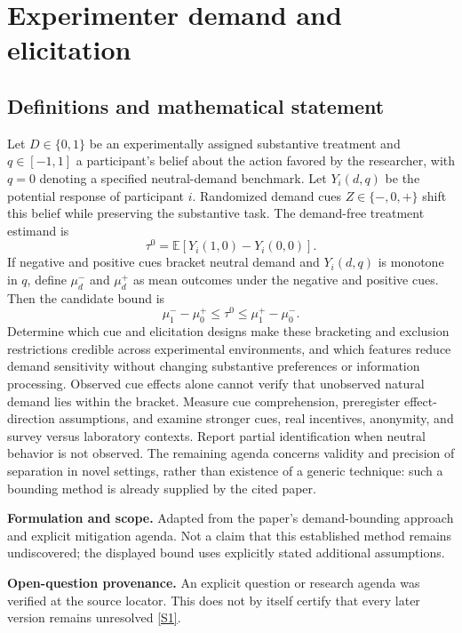\documentclass[11pt]{article}
\newcommand{\sref}[2]{\hyperlink{source:#1:#2}{[S#2]}}
\begin{document}
\section*{Experimenter demand and elicitation}\label{30007589}
\subsection{Definitions and mathematical statement}
Let \(D\in\{0,1\}\) be an experimentally assigned substantive treatment and \(q\in[-1,1]\) a participant's belief about the action favored by the researcher, with \(q=0\) denoting a specified neutral-demand benchmark. Let \(Y_i(d,q)\) be the potential response of participant \(i\). Randomized demand cues \(Z\in\{-,0,+\}\) shift this belief while preserving the substantive task. The demand-free treatment estimand is
\[\tau^0=\mathbb E[Y_i(1,0)-Y_i(0,0)].\]
If negative and positive cues bracket neutral demand and \(Y_i(d,q)\) is monotone in \(q\), define \(\mu_d^-\) and \(\mu_d^+\) as mean outcomes under the negative and positive cues. Then the candidate bound is
\[\mu_1^- -\mu_0^+\leq\tau^0\leq\mu_1^+ -\mu_0^-.\]
Determine which cue and elicitation designs make these bracketing and exclusion restrictions credible across experimental environments, and which features reduce demand sensitivity without changing substantive preferences or information processing. Observed cue effects alone cannot verify that unobserved natural demand lies within the bracket. Measure cue comprehension, preregister effect-direction assumptions, and examine stronger cues, real incentives, anonymity, and survey versus laboratory contexts. Report partial identification when neutral behavior is not observed. The remaining agenda concerns validity and precision of separation in novel settings, rather than existence of a generic technique: such a bounding method is already supplied by the cited paper.

\par\textbf{Formulation and scope.} Adapted from the paper’s demand-bounding approach and explicit mitigation agenda. Not a claim that this established method remains undiscovered; the displayed bound uses explicitly stated additional assumptions.

\par\textbf{Open-question provenance.} An explicit question or research agenda was verified at the source locator. This does not by itself certify that every later version remains unresolved \sref{30007589}{1}.
\end{document}

